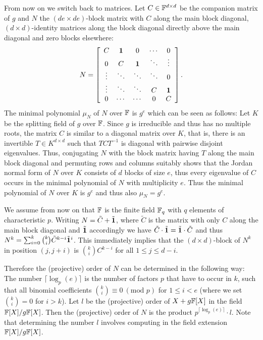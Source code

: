 From now on we switch back to matrices. Let $C \in \mathbb{F}^{d \times d}$ be 
the companion matrix of $g$ and $N$ the $(de \times de)$-block matrix with 
$C$ along the main block diagonal, $(d \times d)$-identity matrices
along the block diagonal directly above the main diagonal and zero blocks
elsewhere:
\[ N = \left[ \begin{array}{ccccc}
    C      & \mathbf{1}   & 0      & \cdots & 0 \\
    0      & C      & \mathbf{1}   & \ddots & \vdots \\
    \vdots & \ddots & \ddots & \ddots & 0 \\
    \vdots & \ddots & \ddots & C      & \mathbf{1} \\
    0      & \cdots & \cdots & 0      & C
\end{array} \right]. \]
The minimal polynomial $\mu_N$ of $N$ over $\mathbb{F}$ is $g^e$ 
which can be seen as follows:
Let $K$ be the splitting field of $g$ over $\mathbb{F}$. Since $g$ is
irreducible and thus has no multiple roots, the 
matrix $C$ is similar to a diagonal matrix over $K$, that is, there is an
invertible $T \in K^{d \times d}$ such that $TCT^{-1}$ is diagonal
with pairwise disjoint eigenvalues.
Thus, conjugating $N$ with the block matrix having $T$ along the
main block diagonal and permuting rows and columns suitably shows that
the Jordan normal form of $N$ over $K$ consists of $d$ blocks of
size $e$, thus every eigenvalue of $C$ occurs in the minimal
polynomial of $N$ with multiplicity $e$. Thus the minimal polynomial
of $N$ over $K$ is $g^e$ and thus also $\mu_N = g^e$.

We assume from now on that $\mathbb{F}$ is the finite field $\mathbb{F}_q$ with $q$
elements of characteristic $p$.
Writing $N = \tilde C + \tilde {\mathbf{1}}$, where $\tilde C$ is the matrix
with only $C$ along the main block diagonal and $\tilde {\mathbf{1}}$
accordingly we have $\tilde C \cdot \tilde {\mathbf{1}} = \tilde {\mathbf{1}} \cdot \tilde C$
and thus $N^k = \sum_{i=0}^k {k \choose i} \tilde C^{k-i} \tilde
{\mathbf{1}}^i$. This immediately implies that the $(d \times d)$-block
of $N^k$ in position $(j,j+i)$ is ${k \choose i}C^{k-i}$ for all
$1 \le j \le d-i$. 

Therefore the (projective) order of $N$ can be determined in the
following way: The number $\lceil \log_p(e)\rceil$ is the number
of factors $p$ that have to occur in $k$, such that all binomial
coefficients ${k \choose i} \equiv 0 \ (\mbox{mod } p)$ for $1 \le i < e$ 
(where we set ${k
\choose i} = 0$ for $i > k$). Let $l$ be the (projective) order of
$X+g\mathbb{F}[X]$ in the field $\mathbb{F}[X]/g\mathbb{F}[X]$. Then the (projective) order of
$N$ is the product $p^{\lceil \log_p(e) \rceil} \cdot l$. Note that
determining the number $l$ involves computing in the field extension
$\mathbb{F}[X]/g\mathbb{F}[X]$.

